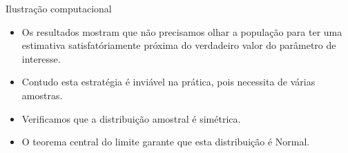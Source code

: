 \documentclass[
  ignorenonframetext,
  serif,
  professionalfont,
  usenames,
  dvipsnames,
  aspectratio = 169]{beamer}
\providecommand{\tightlist}{%
  \setlength{\itemsep}{0pt}\setlength{\parskip}{0pt}}
\renewcommand{\tightlist}{%
  \setlength{\itemsep}{0\baselineskip}
  \setlength{\parskip}{0.25\baselineskip}
}
\begin{document}
\begin{frame}{Ilustração computacional}
\protect\hypertarget{ilustrauxe7uxe3o-computacional-7}{}
\begin{itemize}
\tightlist
\item
  Os resultados mostram que não precisamos olhar a população para ter
  uma estimativa satisfatóriamente próxima do verdadeiro valor do
  parâmetro de interesse.
\end{itemize}

\vspace{0.3cm}

\begin{itemize}
\tightlist
\item
  Contudo esta estratégia é inviável na prática, pois necessita de
  várias amostras.
\end{itemize}

\vspace{0.3cm}

\begin{itemize}
\tightlist
\item
  Verificamos que a distribuição amostral é simétrica.
\end{itemize}

\vspace{0.3cm}

\begin{itemize}
\tightlist
\item
  O teorema central do limite garante que esta distribuição é Normal.
\end{itemize}
\end{frame}
\end{document}
